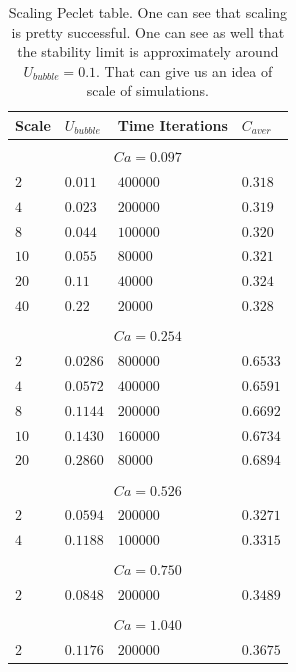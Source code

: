 \documentclass{article}
\begin{document}
\begin{table}[htb!]
\begin{tabularx}{\textwidth}{|X|X|X|X|}
\hline
Scale&$U_{bubble}$&Time Iterations&$C_{aver}$\\
\hline
\multicolumn{4}{c}{}\\
\multicolumn{4}{c}{$Ca=0.097$}\\
\hline
$2$ &$0.011$&$400000$&$0.318$\\
$4$ &$0.023$&$200000$&$0.319$\\
$8$ &$0.044$&$100000$&$0.320$\\
$10$&$0.055$&$80000$ &$0.321$\\
$20$&$0.11 $&$40000$ &$0.324$\\
$40$&$0.22 $&$20000$ &$0.328$\\
\hline
\multicolumn{4}{c}{}\\
\multicolumn{4}{c}{$Ca=0.254$}\\
\hline
$2$& $0.0286$&$800000$&$0.6533$\\
$4$& $0.0572$&$400000$&$0.6591$\\
$8$& $0.1144$&$200000$&$0.6692$\\
$10$&$0.1430$&$160000$&$0.6734$\\
$20$&$0.2860$&$80000$ &$0.6894$\\
\hline
\multicolumn{4}{c}{}\\
\multicolumn{4}{c}{$Ca=0.526$}\\
\hline
$2$&$0.0594$&$200000$&$0.3271$\\
$4$&$0.1188$&$100000$&$0.3315$\\
\hline
\multicolumn{4}{c}{}\\
\multicolumn{4}{c}{$Ca=0.750$}\\
\hline
$2$&$0.0848$&$200000$&$0.3489$\\
\hline
\multicolumn{4}{c}{}\\
\multicolumn{4}{c}{$Ca=1.040$}\\
\hline
$2$&$0.1176$&$200000$&$0.3675$\\
\hline
\end{tabularx}
\caption{Scaling Peclet table. One can see that scaling is pretty successful. One can see as well
that the stability limit is approximately around $U_{bubble}=0.1$. That can give us an idea of
scale of simulations. \label{table:scaling:peclet}}
\end{table}
\end{document}
